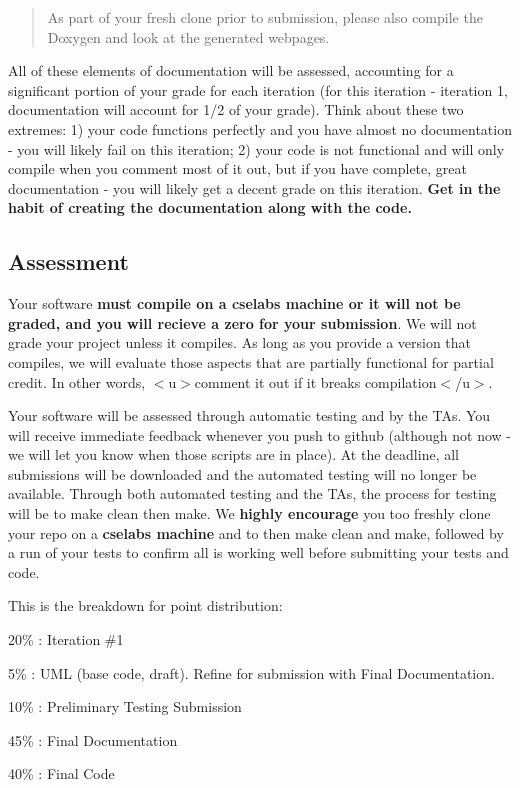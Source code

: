 \begin{quote}
As part of your fresh clone prior to submission, please also compile the Doxygen and look at the generated webpages. \end{quote}


All of these elements of documentation will be assessed, accounting for a significant portion of your grade for each iteration (for this iteration -\/ iteration 1, documentation will account for 1/2 of your grade). Think about these two extremes\+: 1) your code functions perfectly and you have almost no documentation -\/ you will likely fail on this iteration; 2) your code is not functional and will only compile when you comment most of it out, but if you have complete, great documentation -\/ you will likely get a decent grade on this iteration. {\bfseries Get in the habit of creating the documentation along with the code.}





\subsection*{Assessment}

Your software {\bfseries must compile on a cselabs machine or it will not be graded, and you will recieve a zero for your submission}. We will not grade your project unless it compiles. As long as you provide a version that compiles, we will evaluate those aspects that are partially functional for partial credit. In other words, $<$u$>$comment it out if it breaks compilation$<$/u$>$.

Your software will be assessed through automatic testing and by the T\+As. You will receive immediate feedback whenever you push to github (although not now -\/ we will let you know when those scripts are in place). At the deadline, all submissions will be downloaded and the automated testing will no longer be available. Through both automated testing and the T\+As, the process for testing will be to {\ttfamily make clean} then {\ttfamily make}. We {\bfseries highly encourage} you too freshly clone your repo on a {\bfseries cselabs machine} and to then {\ttfamily make clean} and {\ttfamily make}, followed by a run of your tests to confirm all is working well before submitting your tests and code.

This is the breakdown for point distribution\+:

20\% \+: Iteration \#1
\begin{DoxyItemize}
\item 5\% \+: U\+ML (base code, draft). Refine for submission with Final Documentation.
\item 10\% \+: Preliminary Testing Submission
\item 45\% \+: Final Documentation
\item 40\% \+: Final Code
\end{DoxyItemize}

